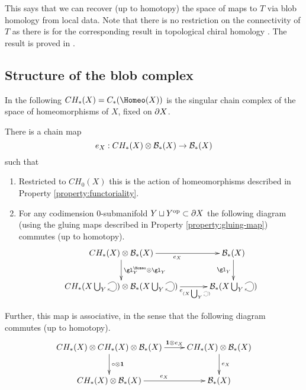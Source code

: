 \documentclass{pnastwo}
\begin{document}
\begin{article}
This says that we can recover (up to homotopy) the space of maps to $T$ via blob homology from local data. 
Note that there is no restriction on the connectivity of $T$ as there is for 
the corresponding result in topological chiral homology \cite[Theorem 3.8.6]{0911.0018}. 
The result is proved in \cite[\S 7.3]{1009.5025}.

\subsection{Structure of the blob complex}
\label{sec:structure}

In the following $\CH{X} = C_*(\Homeo(X))$ is the singular chain complex of the space 
of homeomorphisms of $X$, fixed on $\partial X$.

\begin{thm}
\label{thm:CH}\label{thm:evaluation}
There is a chain map
\begin{equation*}
e_X: CH_*(X) \otimes {\mathcal B}_*(X) \to {\mathcal B}_*(X)
\end{equation*}
such that
\begin{enumerate}
\item Restricted to $CH_0(X)$ this is the action of homeomorphisms described in Property \ref{property:functoriality}. 

\item For
any codimension $0$-submanifold $Y \sqcup Y^\text{op} \subset \partial X$ the following diagram
(using the gluing maps described in Property \ref{property:gluing-map}) commutes (up to homotopy).
\begin{equation*}
\xymatrix@C+0.3cm{
     \CH{X} \tensor \bc_*(X)
        \ar[r]_{e_{X}}  \ar[d]^{\gl^{\Homeo}_Y \tensor \gl_Y}  &
            \bc_*(X) \ar[d]_{\gl_Y} \\
     \CH{X \bigcup_Y \selfarrow} \tensor \bc_*(X \bigcup_Y \selfarrow) \ar[r]_<<<<<<<{e_{(X \bigcup_Y \scalebox{0.5}{\selfarrow})}}    & \bc_*(X \bigcup_Y \selfarrow)
}
\end{equation*}
\end{enumerate}

Further, this map is associative, in the sense that the following diagram commutes (up to homotopy).
\begin{equation*}
\xymatrix{
\CH{X} \tensor \CH{X} \tensor \bc_*(X) \ar[r]^<<<<<{\id \tensor e_X} \ar[d]^{\compose \tensor \id} & \CH{X} \tensor \bc_*(X) \ar[d]^{e_X} \\
\CH{X} \tensor \bc_*(X) \ar[r]^{e_X} & \bc_*(X)
}
\end{equation*}
\end{thm}


\end{article}
\end{document}
